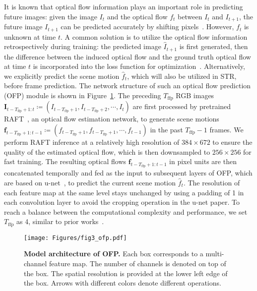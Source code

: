 It is known that optical flow information plays an important role in predicting future images: given the image $I_t$ and the optical flow $f_t$ between $I_t$ and $I_{t+1}$, the future image $I_{t+1}$ can be predicted accurately by shifting pixels~\citep{fang2022traffic}. However, $f_t$ is unknown at time $t$. A common solution is to utilize the optical flow information retrospectively during training: the predicted image $\hat{I}_{t+1}$ is first generated, then the difference between the induced optical flow and the ground truth optical flow at time $t$ is incorporated into the loss function for optimization~\citep{liu2018future,ye2019anopcn}. Alternatively, we explicitly predict the scene motion $\hat{f}_t$, which will also be utilized in STR, before frame prediction. The network structure of such an optical flow prediction (OFP) module is shown in Figure~\ref{fig:ofp}. The preceding $T_\text{ffp}$ RGB images $\mathbf{I}_{t - T_\text{ffp} + 1:t} \coloneqq (I_{t - T_\text{ffp} + 1}, I_{t - T_\text{ffp} + 2}, \cdots, I_t)$ are first processed by pretrained RAFT~\citep{teed2020raft}, an optical flow estimation network, to generate scene motions $\mathbf{f}_{t - T_\text{ffp} + 1:t - 1} \coloneqq (f_{t - T_\text{ffp} + 1}, f_{t - T_\text{ffp} + 1}, \cdots, f_{t - 1})$ in the past $T_\text{ffp} - 1$ frames. We perform RAFT inference at a relatively high resolution of $384 \times 672$ to ensure the quality of the estimated optical flow, which is then downsampled to $256 \times 256$ for fast training. The resulting optical flows $\mathbf{f}_{t - T_\text{ffp} + 1:t - 1}$ in pixel units are then concatenated temporally and fed as the input to subsequent layers of OFP, which are based on u-net~\citep{ronneberger2015u}, to predict the current scene motion $\hat{f}_t$. The resolution of each feature map at the same level stays unchanged by using a padding of 1 in each convolution layer to avoid the cropping operation in the u-net paper. To reach a balance between the computational complexity and performance, we set $T_\text{ffp}$ as 4, similar to prior works~\citep{liu2018future,fang2022traffic}.

\begin{figure}[t]
  \centering
  \texttt{[image: Figures/fig3\_ofp.pdf]}
  \caption{\textbf{Model architecture of OFP.} Each box corresponds to a multi-channel feature map. The number of channels is denoted on top of the box. The spatial resolution is provided at the lower left edge of the box. Arrows with different colors denote different operations.}
  \label{fig:ofp}
\end{figure}

